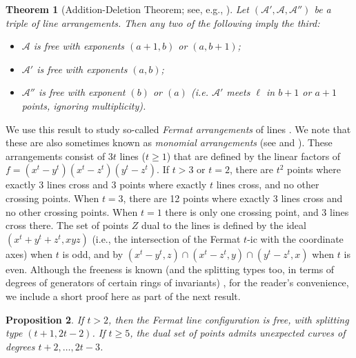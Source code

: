 \documentclass[12pt]{amsart}
\numberwithin{equation}{section}
\newtheorem{theorem}{Theorem}[section]
\newtheorem{proposition}[theorem]{Proposition}
\theoremstyle{definition}
\begin{document}
\begin{theorem} [{Addition-Deletion Theorem; see, e.g., \cite[Theorem 4.51]{OT}}] 
       \label{add-del}
Let $(\mathcal A', \mathcal A, \mathcal A'')$ be a triple of line arrangements. Then any two of the following imply the third:

\begin{itemize}

\item[] $\mathcal A$ is free with exponents $(a+1,b)$ or $(a, b+1)$;

\item[] $\mathcal A'$ is free with exponents $(a,b)$;

\item[] $\mathcal A''$ is free with exponent $(b)$ or $(a)$ (i.e. $\mathcal A'$ meets $\ell$ in $b+1$ or $a+1$ points, ignoring multiplicity).

\end{itemize}

\end{theorem}

We use this result to study so-called \emph{Fermat arrangements} of lines \cite{U}. 
We note that these are also sometimes known as {\it monomial arrangements}
(see \cite[Example 10.6]{refSuciu} and \cite[page 247]{OT}).
These arrangements consist of $3 t$ lines ($t \ge 1$) that are defined by the linear factors of 
$f=(x^t-y^t)(x^t-z^t)(y^t-z^t)$. If  $t>3$ or $t=2$, there are $t^2$ points where exactly 3 lines cross and 3 points where exactly
$t$ lines cross, and no other crossing points. When $t=3$, there are 12 points where exactly 3 lines cross
and no other crossing points. When $t=1$ there is only one crossing point, and 3 lines cross there.
The set of  points $Z$ dual to the lines is defined by the ideal $(x^t+y^t+z^t, xyz)$
(i.e., the intersection of the Fermat $t$-ic with the coordinate axes) when $t$ is odd, and by
$(x^t-y^t,z)\cap (x^t-z^t,y)\cap(y^t-z^t,x)$ when $t$ is even.
Although the freeness is known (and the splitting types too, in terms of degrees of generators
of certain rings of invariants) \cite[Theorem 6.60, \& p.\ 247]{OT},
for the reader's convenience, we include a short proof here as part of the next result.

\begin{proposition} \label{FermatProp}
If $t>2$, then the  Fermat line configuration is free, with splitting type $(t+1, 2t-2)$. If $t \geq 5$, 
the dual set of points admits unexpected curves of degrees $t+2,\dots,2t-3$.
\end{proposition}
\end{document}

